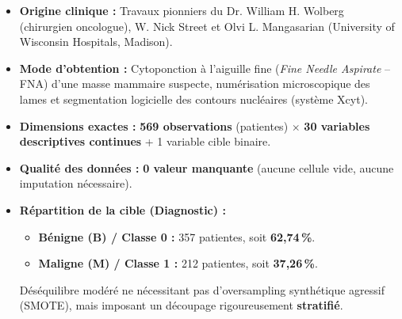 \documentclass[10pt,a4paper]{article}
\begin{document}
\begin{tcolorbox}[bluebox, title={Données Clés de la Base WDBC (UCI Machine Learning Repository ID = 17)}]
\small
\begin{itemize}[leftmargin=0.5cm, itemsep=2pt, parsep=0pt]
	\item \textbf{Origine clinique :} Travaux pionniers du Dr. William H. Wolberg (chirurgien oncologue), W. Nick Street et Olvi L. Mangasarian (University of Wisconsin Hospitals, Madison).
	\item \textbf{Mode d'obtention :} Cytoponction à l'aiguille fine (\textit{Fine Needle Aspirate} -- FNA) d'une masse mammaire suspecte, numérisation microscopique des lames et segmentation logicielle des contours nucléaires (système Xcyt).
	\item \textbf{Dimensions exactes :} \textbf{569 observations} (patientes) $\times$ \textbf{30 variables descriptives continues} + 1 variable cible binaire.
	\item \textbf{Qualité des données :} \textbf{0 valeur manquante} (aucune cellule vide, aucune imputation nécessaire).
	\item \textbf{Répartition de la cible (Diagnostic) :}
	\begin{itemize}[itemsep=1pt]
		\item \textbf{Bénigne (B) / Classe 0 :} 357 patientes, soit \textbf{62,74\,\%}.
		\item \textbf{Maligne (M) / Classe 1 :} 212 patientes, soit \textbf{37,26\,\%}.
	\end{itemize}
	Déséquilibre modéré ne nécessitant pas d'oversampling synthétique agressif (SMOTE), mais imposant un découpage rigoureusement \textbf{stratifié}.
\end{itemize}
\end{tcolorbox}
\end{document}
